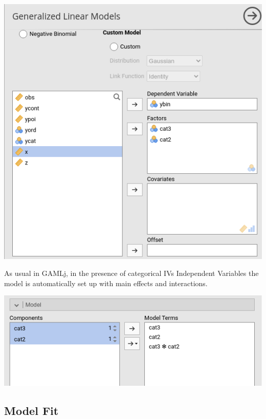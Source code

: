 \documentclass[
]{book}
\begin{document}
\includegraphics[width=7.89in]{bookletpics/3_logistic_input4}

As usual in {GAMLj}, in the presence of categorical {IVs {Independent Variables} } the model is automatically set up with main effects and interactions.

\includegraphics[width=7.89in]{bookletpics/3_logistic_input5}

\hypertarget{model-fit-1}{%
\subsection{Model Fit}\label{model-fit-1}}
\end{document}
